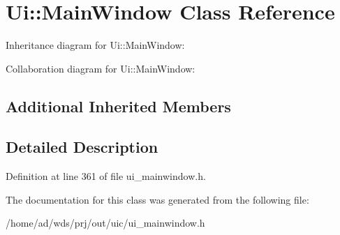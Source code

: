 \hypertarget{class_ui_1_1_main_window}{}\section{Ui\+:\+:Main\+Window Class Reference}
\label{class_ui_1_1_main_window}


Inheritance diagram for Ui\+:\+:Main\+Window\+:


Collaboration diagram for Ui\+:\+:Main\+Window\+:
\subsection*{Additional Inherited Members}


\subsection{Detailed Description}


Definition at line 361 of file ui\+\_\+mainwindow.\+h.



The documentation for this class was generated from the following file\+:\begin{DoxyCompactItemize}
\item 
/home/ad/wds/prj/out/uic/ui\+\_\+mainwindow.\+h\end{DoxyCompactItemize}
